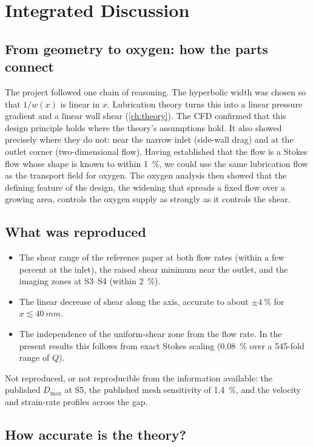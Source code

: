 \chapter{Integrated Discussion}
\label{ch:discussion}

\section{From geometry to oxygen: how the parts connect}

The project followed one chain of reasoning. The hyperbolic width was chosen so that $1/w(x)$ is linear in $x$. Lubrication theory turns this into a linear pressure gradient and a linear wall shear (\cref{ch:theory}). The CFD confirmed that this design principle holds where the theory's assumptions hold. It also showed precisely where they do not: near the narrow inlet (side-wall drag) and at the outlet corner (two-dimensional flow). Having established that the flow is a Stokes flow whose shape is known to within \SI{1}{\percent}, we could use the same lubrication flow as the transport field for oxygen. The oxygen analysis then showed that the defining feature of the design, the widening that spreads a fixed flow over a growing area, controls the oxygen supply as strongly as it controls the shear.

\section{What was reproduced}

\begin{itemize}
\item The shear range of the reference paper at both flow rates (within a few percent at the inlet), the raised shear minimum near the outlet, and the imaging zones at S3--S4 (within \SI{2}{\percent}).
\item The linear decrease of shear along the axis, accurate to about $\pm\SI{4}{\percent}$ for $x\lesssim\SI{40}{mm}$.
\item The independence of the uniform-shear zone from the flow rate. In the present results this follows from exact Stokes scaling (\SI{0.08}{\percent} over a 545-fold range of $Q$).
\end{itemize}
Not reproduced, or not reproducible from the information available: the published $D_{\max}$ at S5, the published mesh sensitivity of \SI{1.4}{\percent}, and the velocity and strain-rate profiles across the gap.

\section{How accurate is the theory?}

